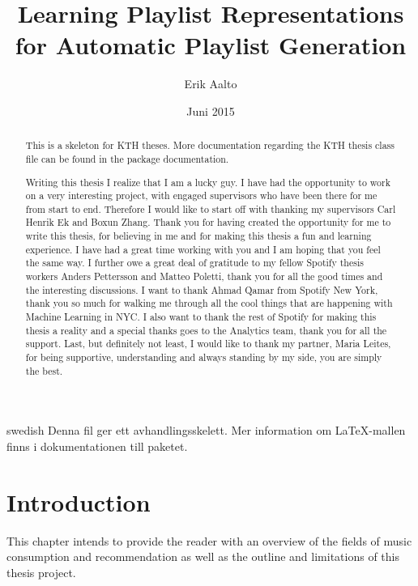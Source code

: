 \documentclass[a4paper,11pt]{kth-mag}
\title{Learning Playlist Representations for Automatic Playlist Generation}
\author{Erik Aalto}
\date{Juni 2015}
\begin{document}
\frontmatter
\pagestyle{empty}
\removepagenumbers
\maketitle
{}
\begin{abstract}
  This is a skeleton for KTH theses. More documentation
  regarding the KTH thesis class file can be found in
  the package documentation.


\end{abstract}
\clearpage
\begin{foreignabstract}{swedish}
  Denna fil ger ett avhandlingsskelett.
  Mer information om \LaTeX-mallen finns i
  dokumentationen till paketet.

\end{foreignabstract}
\clearpage
\renewcommand{\abstractname}{Acknowledgements}
\begin{abstract}
 Writing this thesis I realize that I am a lucky guy. I have had the opportunity to work on a very interesting project, with engaged supervisors who have been there for me from start to end. Therefore I would like to start off with thanking my supervisors Carl Henrik Ek and Boxun Zhang. Thank you for having created the opportunity for me to write this thesis, for believing in me and for making this thesis a fun and learning experience. I have had a great time working with you and I am hoping that you feel the same way. I further owe a great deal of gratitude to my fellow Spotify thesis workers Anders Pettersson and Matteo Poletti, thank you for all the good times and the interesting discussions. I want to thank Ahmad Qamar from Spotify New York, thank you so much for walking me through all the cool things that are happening with Machine Learning in NYC. I also want to thank the rest of Spotify for making this thesis a reality and a special thanks goes to the Analytics team, thank you for all the support.  Last, but definitely not least, I would like to thank my partner, Maria Leites, for being supportive, understanding and always standing by my side, you are simply the best.
\end{abstract}
  

\clearpage
\tableofcontents*
\mainmatter
\pagestyle{newchap}
\chapter{Introduction}
This chapter intends  to provide the reader with an overview of the fields of music consumption and recommendation as well as the outline and limitations of this thesis project.
\end{document}
